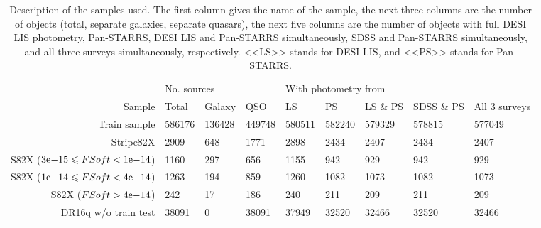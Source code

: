 \documentclass[fleqn,usenatbib]{mnras}
\begin{document}
\begin{table}
	\begin{tabular}{rllllllll}
            \hline
            {} & \multicolumn{3}{l}{No. sources} & \multicolumn{5}{l}{With photometry from} \\
            Sample &       Total &  Galaxy &     QSO &                   LS &      PS & LS \& PS & SDSS \& PS & All 3 surveys \\
            \hline
            Train sample                                              &      586176 &  136428 &  449748 &               580511 &  582240 &   579329 &     578815 &        577049 \\
            Stripe82X                                                 &        2909 &     648 &    1771 &                 2898 &    2434 &     2407 &       2434 &          2407 \\
            S82X (${3}\mathrm{e}{-15} \leqslant FSoft < {1}\mathrm{e}{-14}$) &        1160 &     297 &     656 &                 1155 &     942 &      929 &        942 &           929 \\
            S82X (${1}\mathrm{e}{-14} \leqslant FSoft < {4}\mathrm{e}{-14}$) &        1263 &     194 &     859 &                 1260 &    1082 &     1073 &       1082 &          1073 \\
            S82X ($FSoft > {4}\mathrm{e}{-14}$)                       &         242 &      17 &     186 &                  240 &     211 &      209 &        211 &           209 \\
            DR16q w/o train test                                      &       38091 &       0 &   38091 &                37949 &   32520 &    32466 &      32520 &         32466 \\
            \hline
            \end{tabular}
            \label{tab:samples}
            \caption{Description of the samples used. The first column gives the name of the sample, the next three columns are the number of objects (total, separate galaxies, separate quasars), the next five columns are the number of objects with full DESI LIS photometry, Pan-STARRS, DESI LIS and Pan-STARRS simultaneously, SDSS and Pan-STARRS simultaneously, and all three surveys simultaneously, respectively. <<LS>> stands for DESI LIS, and <<PS>> stands for Pan-STARRS.}
\end{table}
\end{document}

